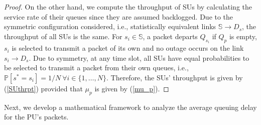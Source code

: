 \documentclass[journal,twocolumn]{IEEEtran}
\begin{document}
\begin{proof}
On the other hand, we compute the throughput of SUs by calculating the service rate of their queues since they are assumed backlogged. Due to the symmetric configuration considered, i.e., statistically equivalent links $\mathbb{S} \rightarrow D_{s}$, the throughput of all SUs is the same. For $s_i \in \mathbb{S}$, a packet departs $Q_{s_i}$ if $Q_{p}$ is empty, $s_{i}$ is selected to transmit a packet of its own and no outage occurs on the link $s_{i} \rightarrow D_{s}$. Due to symmetry, at any time slot, all SUs have equal probabilities to be selected to transmit a packet from their own queues, i.e., $\mathbb{P}[s^*=s_i]=1/N ~ \forall i \in \{1,\hdots,N\}$. Therefore, the SUs' throughput is given by (\ref{SUthrpt}) provided that $\mu_{p}$ is given by (\ref{mu_p}).
\end{proof}

Next, we develop a mathematical framework to analyze the average queuing delay for the PU's packets.
\end{document}
